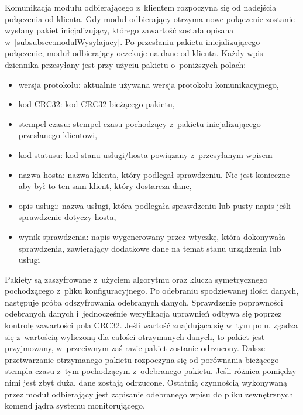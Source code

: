 Komunikacja modułu odbierającego z~klientem rozpoczyna się od nadejścia
połączenia od klienta. Gdy moduł odbierający otrzyma nowe połączenie
zostanie wysłany pakiet inicjalizujący, którego zawartość została
opisana w~\ref{subsubsec:modulWysylajacy}. Po przesłaniu pakietu
inicjalizującego połączenie, moduł odbierający oczekuje na dane od
klienta. Każdy wpis dziennika przesyłany jest przy użyciu pakietu
o~poniższych polach:

\begin{itemize}
\item wersja protokołu: aktualnie używana wersja protokołu komunikacyjnego,
\item kod CRC32: kod CRC32 bieżącego pakietu,
\item stempel czasu: stempel czasu pochodzący z~pakietu
  inicjalizującego przesłanego klientowi,
\item kod statusu: kod stanu usługi/hosta powiązany z~przesyłanym wpisem
\item nazwa hosta: nazwa klienta, który podlegał sprawdzeniu. Nie jest
  konieczne aby był to ten sam klient, który dostarcza dane,
\item opis usługi: nazwa usługi, która podlegała sprawdzeniu lub pusty
  napis jeśli sprawdzenie dotyczy hosta,
\item wynik sprawdzenia: napis wygenerowany przez wtyczkę, która
  dokonywała sprawdzenia, zawierający dodatkowe dane na temat stanu
  urządzenia lub usługi
\end{itemize}

Pakiety są zaszyfrowane z~użyciem algorytmu oraz klucza symetrycznego
pochodzącego z~pliku konfiguracyjnego. Po odebraniu spodziewanej
ilości danych, następuje próba odszyfrowania odebranych
danych. Sprawdzenie poprawności odebranych danych i~jednocześnie
weryfikacja uprawnień odbywa się poprzez kontrolę zawartości pola
CRC32. Jeśli wartość znajdująca się w~tym polu, zgadza się z~wartością
wyliczoną dla całości otrzymanych danych, to pakiet jest przyjmowany,
w~przeciwnym zaś razie pakiet zostanie odrzucony. Dalsze przetwarzanie
otrzymanego pakietu rozpoczyna się od porównania bieżącego stempla
czasu z~tym pochodzącym z~odebranego pakietu. Jeśli różnica pomiędzy
nimi jest zbyt duża, dane zostają odrzucone. Ostatnią czynnością
wykonywaną przez moduł odbierający jest zapisanie odebranego wpisu do
pliku zewnętrznych komend jądra systemu monitorującego.

